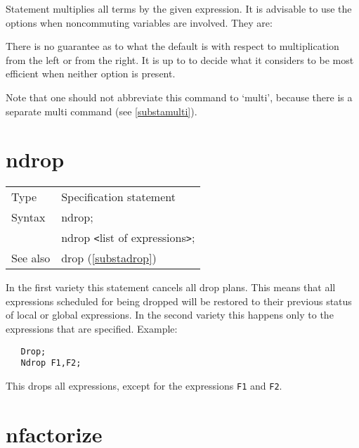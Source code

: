\noindent Statement multiplies all terms by the given 
expression. It is advisable to use the options when noncommuting variables 
are involved. They are:\vspace{1mm}



\noindent There is no guarantee as to what the default is 
with respect to multiplication from the left or from the right. It is up to 
{\FORM} to decide what it considers to be most efficient when neither 
option is present. \vspace{4mm}

\noindent Note that one should not abbreviate this command to `multi', 
because there is a separate multi command (see 
\ref{substamulti}). \vspace{10mm}


\section{ndrop}
\label{substandrop}

\noindent \begin{tabular}{ll}
Type & Specification statement\\
Syntax & ndrop; \\
       & ndrop {\tt<}list of expressions{\tt>};
\\ See also & drop (\ref{substadrop})
\end{tabular} \vspace{4mm}

In the first variety this statement cancels all 
drop plans. This means that all expressions scheduled for being 
dropped will be restored to their previous status of local or global 
expressions. In the second variety this happens only to the expressions 
that are specified. Example:
\begin{verbatim}
   Drop;
   Ndrop F1,F2;
\end{verbatim}
This drops all expressions, except for the expressions \verb:F1: and 
\verb:F2:. \vspace{10mm}


\section{nfactorize}
\label{substanfactorize}

